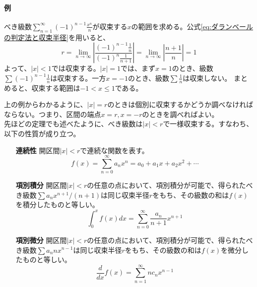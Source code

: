 \documentclass[a4j,dvipdfmx]{jsarticle}
\begin{document}
                \paragraph{例}べき級数$\displaystyle\sum_{n=1}^\infty(-1)^{n-1}\frac{x^n}{n}$が収束する$x$の範囲を求める。公式\eqref{eq:ダランベールの判定法と収束半径}を用いると、
                \begin{equation*}
                    r=\lim_{n\to\infty}\left|\frac{(-1)^{n-1}\frac{1}{n}}{(-1)^n\frac{1}{n+1}}\right|=\lim_{n\to\infty}\left|\frac{n+1}{n}\right|=1
                \end{equation*}
                よって、$|x|<1$では収束する。$|x|=1$では、まず$x=1$のとき、級数$\sum (-1)^{n-1}\frac{1}{n}$は収束する。一方$x=-1$のとき、級数$\sum \frac{1}{n}$は収束しない。
                まとめると、収束する範囲は$-1<x\leq 1$である。

                上の例からわかるように、$|x|=r$のときは個別に収束するかどうか調べなければならない。つまり、区間の端点$x=r,x=-r$のときを調べればよい。\\

                先ほどの定理でも述べたように、べき級数は$|x|<r$で一様収束する。すなわち、以下の性質が成り立つ。
                \begin{enumerate}
                    \item[\textbf{連続性}] 開区間$|x|<r$で連続な関数を表す。
                        \begin{equation}
                            f(x)=\sum_{n=0}^{\infty}a_nx^n = a_0+a_1x+a_2x^2+\cdots
                        \end{equation}
                    \item[\textbf{項別積分}] 開区間$|x|<r$の任意の点において、項別積分が可能で、得られたべき級数$\sum a_n x^{n+1}/(n+1)$は同じ収束半径$r$をもち、その級数の和は$f(x)$を積分したものと等しい。
                        \begin{equation}
                            \int_{0}^{x}f(x)dx=\sum_{n=0}^{\infty}\frac{a_n}{n+1}x^{n+1}
                        \end{equation}
                    \item[\textbf{項別微分}] 開区間$|x|<r$の任意の点において、項別積分が可能で、得られたべき級数$\sum a_n nx^{n-1}$は同じ収束半径$r$をもち、その級数の和は$f(x)$を微分したものと等しい。 
                        \begin{equation}
                            \frac{d}{dx}f(x)=\sum_{n=1}^{\infty}nc_{n}x^{n-1}
                        \end{equation}
                \end{enumerate}
\end{document}
